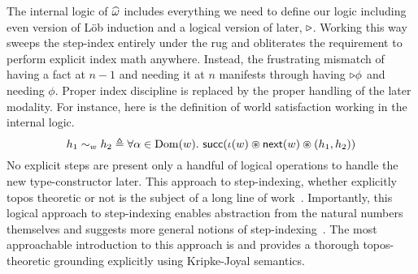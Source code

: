 The internal logic of $\widehat{\omega}$ includes everything we
need to define our logic including even version of L\"ob induction and
a logical version of later, ${\triangleright}$. Working this way sweeps the
step-index entirely under the rug and obliterates the requirement to
perform explicit index math anywhere. Instead, the frustrating
mismatch of having a fact at $n - 1$ and needing it at $n$ manifests
through having ${\triangleright} \phi$ and needing $\phi$. Proper index
discipline is replaced by the proper handling of the later
modality. For instance, here is the definition of world satisfaction
working in the internal logic.
\[
  h_1 \sim_w h_2 \triangleq
  \forall \alpha \in \operatorname{Dom}(w).
  \ \mathsf{succ}(\iota(w) \circledast \mathsf{next}(w) \circledast (h_1, h_2))
\]
No explicit steps are present only a handful of logical operations to
handle the new type-constructor later. This approach to step-indexing,
whether explicitly topos theoretic or not is the subject of a long
line of work~\citep{Svendsen:16}. Importantly, this logical
approach to step-indexing enables abstraction from the natural numbers
themselves and suggests more general notions of
step-indexing~\citep{Svendsen:16}. The most approachable introduction to
this approach is \citet{Dreyer:09} and \citet{Birkedal:steps:11} provides a
thorough topos-theoretic grounding explicitly using Kripke-Joyal
semantics.

